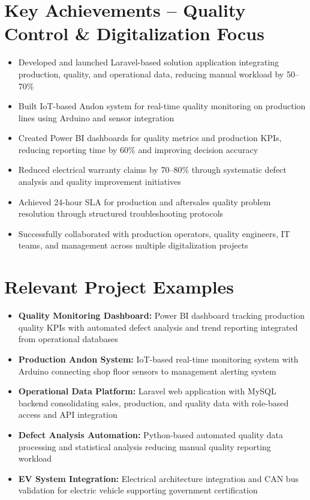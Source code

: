 \documentclass[a4paper,10pt]{article}
\begin{document}
\section*{Key Achievements – Quality Control \& Digitalization Focus}
\begin{itemize}
    \item Developed and launched Laravel-based solution application integrating production, quality, and operational data, reducing manual workload by 50–70\%
    \item Built IoT-based Andon system for real-time quality monitoring on production lines using Arduino and sensor integration
    \item Created Power BI dashboards for quality metrics and production KPIs, reducing reporting time by 60\% and improving decision accuracy
    \item Reduced electrical warranty claims by 70–80\% through systematic defect analysis and quality improvement initiatives
    \item Achieved 24-hour SLA for production and aftersales quality problem resolution through structured troubleshooting protocols
    \item Successfully collaborated with production operators, quality engineers, IT teams, and management across multiple digitalization projects
\end{itemize}

\section*{Relevant Project Examples}
\begin{itemize}
    \item \textbf{Quality Monitoring Dashboard:} Power BI dashboard tracking production quality KPIs with automated defect analysis and trend reporting integrated from operational databases
    \item \textbf{Production Andon System:} IoT-based real-time monitoring system with Arduino connecting shop floor sensors to management alerting system
    \item \textbf{Operational Data Platform:} Laravel web application with MySQL backend consolidating sales, production, and quality data with role-based access and API integration
    \item \textbf{Defect Analysis Automation:} Python-based automated quality data processing and statistical analysis reducing manual quality reporting workload
    \item \textbf{EV System Integration:} Electrical architecture integration and CAN bus validation for electric vehicle supporting government certification
\end{itemize}
\end{document}
